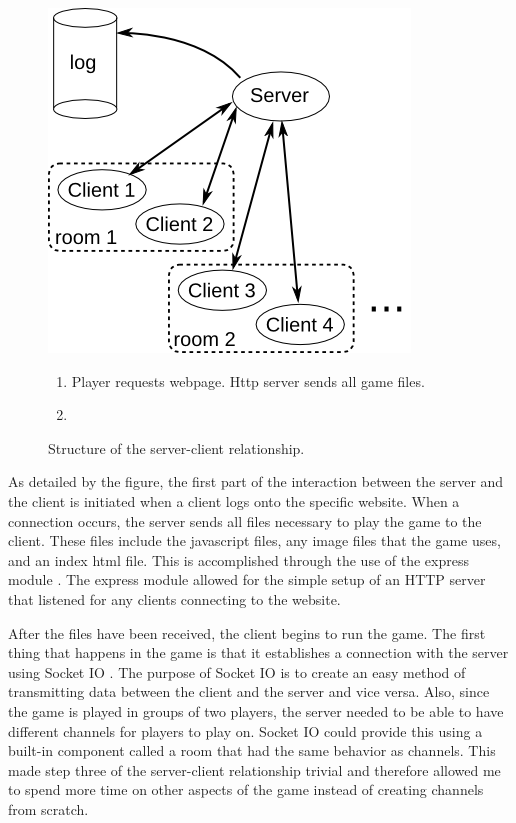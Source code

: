 \begin{figure}
\parbox[t]{0.5\columnwidth}{
\vspace{0pt}\includegraphics[width=0.5\columnwidth]{client-server.png}
}\hspace{-0.5cm}
\parbox[t]{0.5\columnwidth}{
\vspace{0pt}
\begin{enumerate}
\item Player requests webpage. Http server sends all game files.
\item {}
\end{enumerate}
}
\caption{Structure of the server-client
  relationship.}
\label{fig:server-client}
\end{figure}

As detailed by the figure, the first part of the interaction between
the server and the client is initiated when a client logs onto the
specific website. When a connection occurs, the server sends all files
necessary to play the game to the client.  These files include the
javascript files, any image files that the game uses, and an index
html file. This is accomplished through the use of the express module
\cite{express}. The express module allowed for the simple setup of an
HTTP server that listened for any clients connecting to the website.

After the files have been received, the client begins to run the
game. The first thing that happens in the game is that it establishes
a connection with the server using Socket IO \cite{socketIO}. The
purpose of Socket IO is to create an easy method of transmitting data
between the client and the server and vice versa. Also, since the game
is played in groups of two players, the server needed to be able to
have different channels for players to play on. Socket IO could
provide this using a built-in component called a room that had the
same behavior as channels. This made step three of the server-client
relationship trivial and therefore allowed me to spend more time on
other aspects of the game instead of creating channels from scratch.


